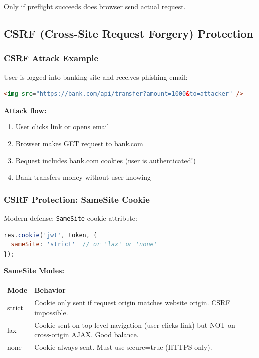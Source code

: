 \documentclass[12pt,a4paper,oneside]{article}
\begin{document}
Only if preflight succeeds does browser send actual request.

\subsection{CSRF (Cross-Site Request Forgery) Protection}

\subsubsection{CSRF Attack Example}

User is logged into banking site and receives phishing email:

\begin{lstlisting}[language=HTML, caption=Malicious Email Content]
<img src="https://bank.com/api/transfer?amount=1000&to=attacker" />
\end{lstlisting}

\textbf{Attack flow:}

\begin{enumerate}
    \item User clicks link or opens email
    \item Browser makes GET request to bank.com
    \item Request includes bank.com cookies (user is authenticated!)
    \item Bank transfers money without user knowing
\end{enumerate}

\subsubsection{CSRF Protection: SameSite Cookie}

Modern defense: \texttt{SameSite} cookie attribute:

\begin{lstlisting}[language=JavaScript, caption=SameSite Cookie Protection]
res.cookie('jwt', token, {
  sameSite: 'strict'  // or 'lax' or 'none'
});
\end{lstlisting}

\textbf{SameSite Modes:}

\begin{table}[H]
\centering
\begin{tabular}{|p{2.5cm}|p{9.5cm}|}
\hline
\textbf{Mode} & \textbf{Behavior} \\
\hline
strict & Cookie only sent if request origin matches website origin. CSRF impossible. \\
\hline
lax & Cookie sent on top-level navigation (user clicks link) but NOT on cross-origin AJAX. Good balance. \\
\hline
none & Cookie always sent. Must use secure=true (HTTPS only). \\
\hline
\end{tabular}
\end{table}
\end{document}
